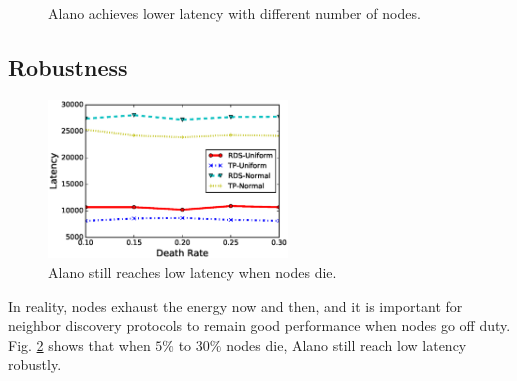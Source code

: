 \begin{figure}[!h]
\centering
{}
\hspace{0.01in}
\caption{Alano achieves lower latency with different number of nodes.}
\label{fig_node}
\end{figure}

\subsection{Robustness}


\begin{figure}[!h]
\centering
\includegraphics[width=2.5in]{Figure/robust}
\caption{Alano still reaches low latency when nodes die.}
\label{fig_robust}
\end{figure}

In reality, nodes exhaust the energy now and then, and it is important for neighbor discovery protocols to remain good performance when nodes go off duty. Fig. \ref{fig_robust} shows that when $5\%$ to $30\%$ nodes die, Alano still reach low latency robustly.

